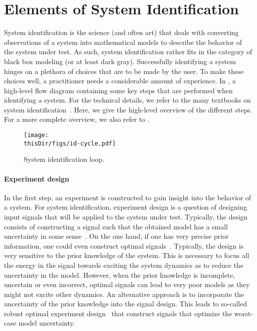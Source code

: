 \section{Elements of System Identification}
System identification is the science (and often art) that deals with converting observations of a system into mathematical models to describe the behavior of the system under test.
As such, system identification rather fits in the category of black box modeling (or at least dark gray).
Successfully identifying a system hinges on a plethora of choices that are to be made by the user.
To make these choices well, a practitioner needs a considerable amount of experience. 
In , a high-level flow diagram containing some key steps that are performed when identifying a system.
For the technical details, we refer to the many textbooks on system identification~\citep{Keesman2011,Norton1986,Soderstrom1989,Ljung1999,Pintelon2012}.
Here, we give the high-level overview of the different steps.
For a more complete overview, we also refer to \citet{Ljung2010}.

\begin{figure}
  \centering
  \texttt{[image: \\thisDir/figs/id-cycle.pdf]}
  \caption[System identification loop]{System identification loop. }
  \label{fig:intro:identification-cycle}
\end{figure}

\paragraph{Experiment design}
In the first step, an experiment is constructed to gain insight into the behavior of a system.
For system identification, experiment design is a question of designing input signals that will be applied to the system under test.
Typically, the design consists of constructing a signal such that the obtained model  has a small uncertainty in some sense~\citep{Goodwin1977,Mehra1974,Goodwin2006GBO,Levadi1966}.
On the one hand, if one has very precise prior information, one could even construct optimal signals~\citep{Gagliardi1967,Karlin1966,Gevers2011ExpDesign,Zarrop1979}.
Typically, the design is very sensitive to the prior knowledge of the system.
This is necessary to focus all the energy in the signal towards exciting the system dynamics as to reduce the uncertainty in the model.
However, when the prior knowledge is incomplete, uncertain or even incorrect, optimal signals can lead to very poor models as they might not excite other dynamics.
An alternative approach is to incorporate the uncertainty of the prior knowledge into the signal design.
This leads to so-called robust optimal experiment design~\citep{Rojas2012,Goodwin2006} that construct signals that optimize the worst-case model uncertainty.

